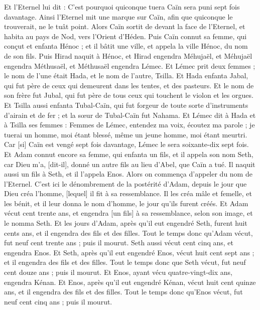\begin{multicols}{2}
Et l'Eternel lui dit : C'est pourquoi quiconque tuera Caïn sera puni sept fois davantage. Ainsi l'Eternel mit une marque sur Caïn, afin que quiconque le trouverait, ne le tuât point.
Alors Caïn sortit de devant la face de l'Eternel, et habita au pays de Nod, vers l'Orient d'Héden.
Puis Caïn connut sa femme, qui conçut et enfanta Hénoc ; et il bâtit une ville, et appela la ville Hénoc, du nom de son fils.
Puis Hirad naquit à Hénoc, et Hirad engendra Méhujaël, et Méhujaël engendra Méthusaël, et Méthusaël engendra Lémec.
Et Lémec prit deux femmes ; le nom de l'une était Hada, et le nom de l'autre, Tsilla.
Et Hada enfanta Jabal, qui fut père de ceux qui demeurent dans les tentes, et des pasteurs.
Et le nom de son frère fut Jubal, qui fut père de tous ceux qui touchent le violon et les orgues.
Et Tsilla aussi enfanta Tubal-Caïn, qui fut forgeur de toute sorte d'instruments d'airain et de fer ; et la sœur de Tubal-Caïn fut Nahama.
Et Lémec dit à Hada et à Tsilla ses femmes : Femmes de Lémec, entendez ma voix, écoutez ma parole ; je tuerai un homme, moi étant blessé, même un jeune homme, moi étant meurtri.
Car [si] Caïn est vengé sept fois davantage, Lémec le sera soixante-dix sept fois.
Et Adam connut encore sa femme, qui enfanta un fils, et il appela son nom Seth, car Dieu m'a, [dit-il], donné un autre fils au lieu d'Abel, que Caïn a tué.
Il naquit aussi un fils à Seth, et il l'appela Enos. Alors on commença d'appeler du nom de l'Eternel.
\VerseOne{}C'est ici le dénombrement de la postérité d'Adam, depuis le jour que Dieu créa l'homme, [lequel] il fit à sa ressemblance.
Il les créa mâle et femelle, et les bénit, et il leur donna le nom d'homme, le jour qu'ils furent créés.
Et Adam vécut cent trente ans, et engendra [un fils] à sa ressemblance, selon son image, et le nomma Seth.
Et les jours d'Adam, après qu'il eut engendré Seth, furent huit cents ans, et il engendra des fils et des filles.
Tout le temps donc qu'Adam vécut, fut neuf cent trente ans ; puis il mourut.
Seth aussi vécut cent cinq ans, et engendra Enos.
Et Seth, après qu'il eut engendré Enos, vécut huit cent sept ans ; et il engendra des fils et des filles.
Tout le temps donc que Seth vécut, fut neuf cent douze ans ; puis il mourut.
Et Enos, ayant vécu quatre-vingt-dix ans, engendra Kénan.
Et Enos, après qu'il eut engendré Kénan, vécut huit cent quinze ans, et il engendra des fils et des filles.
Tout le temps donc qu'Enos vécut, fut neuf cent cinq ans ; puis il mourut.

\end{multicols}
